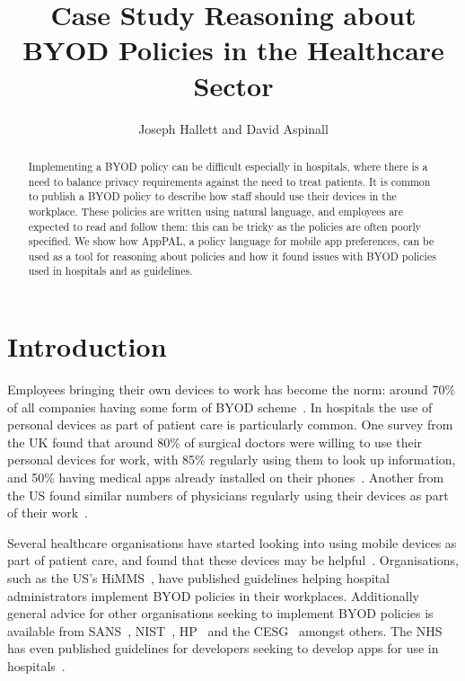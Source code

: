 \documentclass[a4paper]{article}
\title{Case Study Reasoning about BYOD Policies in the Healthcare Sector}
\author{Joseph Hallett and David Aspinall}
\newcommand{\apppal}[0]{App{P}{A}{L}}
\begin{document}
\maketitle

\begin{abstract}
  Implementing a \ac{BYOD} policy can be difficult especially in hospitals, where there is a need to balance privacy requirements against the need to treat patients.
  It is common to publish a \ac{BYOD} policy to describe how staff should use their devices in the workplace.
  These policies are written using natural language, and employees are expected to read and follow them: this can be tricky as the policies are often poorly specified.
  We show how \apppal{}, a policy language for mobile app preferences, can be used as a tool for reasoning about policies and how it found issues with BYOD policies used in hospitals and as guidelines.
\end{abstract}

\section{Introduction}
\label{sec:intro}

Employees bringing their own devices to work has become the norm:
  around 70\% of all companies having some form of \ac{BYOD} scheme~\cite{schulze_byod_2016}.
In hospitals the use of personal devices as part of patient care is particularly common.
One survey from the UK found that around 80\% of surgical doctors were willing to use their personal devices for work, with 85\% regularly using them to look up information, and 50\% having medical apps already installed on their phones~\cite{patel_uk_2015}.  Another from the US found similar numbers of physicians regularly using their devices as part of their work~\cite{moyer_managing_2013}.

Several healthcare organisations have started looking into using mobile devices as part of patient care, and found that these devices may be helpful~\cite{prgomet_impact_2009,faulds_feasibility_2016}.  
Organisations, such as the US's HiMMS~\cite{seymour_mobile_2012}, have published guidelines helping hospital administrators implement BYOD policies in their workplaces.  
Additionally general advice for other organisations seeking to implement BYOD policies is available from SANS~\cite{nicholas_r._c._guerin_security_2008}, NIST~\cite{souppaya_guidelines_????}, HP~\cite{hp_byod_????} and the CESG~\cite{cesg_byod_2015} amongst others.
The NHS has even published guidelines for developers seeking to develop apps for use in hospitals~\cite{prgomet_impact_2009}.
\end{document}
